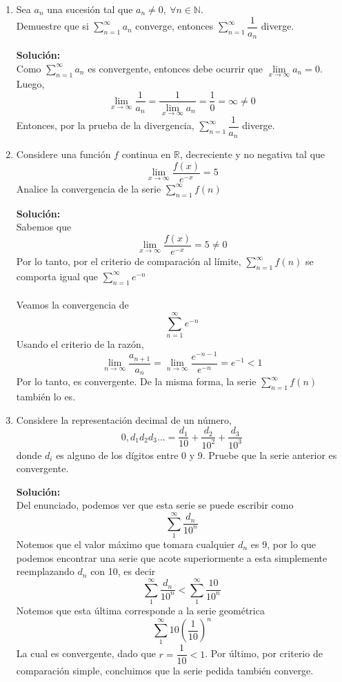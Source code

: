 \documentclass[12pt]{article}
\newenvironment{solucion}
{\begin{mdframed}[backgroundcolor=black!10]
		{\bf Solución:}\\
	}
	{
	\end{mdframed}
}
\newenvironment{preguntas}
{\begin{enumerate}\itemsep12pt
	}
	{
	\end{enumerate}
}
\newcommand{\ra}{\rightarrow}
\newcommand{\N}{\mathbb{N}}
\newcommand{\R}{\mathbb{R}}
\begin{document}
\begin{preguntas}
\begin{solucion}
Luego,
$$\lim\limits_{x \ra \infty} b_n
= \lim\limits_{x \ra \infty} ln(1+a_n)
= ln(1+\lim\limits_{x \ra \infty} a_n)
= ln(1+0)
= 0$$

$$\blacksquare$$
\end{solucion}
\item Sea $a_n$ una sucesión tal que $a_n \neq 0,\ \forall n \in \N$.\\
	Demuestre que si $\sum\limits_{n=1}^{\infty}a_n$ converge, entonces $\sum\limits_{n=1}^{\infty}\dfrac{1}{a_n}$ diverge.
\begin{solucion}
Como $\sum\limits_{n=1}^{\infty}a_n$ es convergente, entonces debe ocurrir que
$\lim\limits_{x \ra \infty} a_n = 0$.\\

Luego,
$$\lim\limits_{x \ra \infty} \dfrac{1}{a_n}
= \dfrac{1}{\lim\limits_{x \ra \infty} a_n}
= \dfrac{1}{0}
= \infty
\neq 0$$
Entonces, por la prueba de la divergencia, $\sum\limits_{n=1}^{\infty}\dfrac{1}{a_n}$ diverge.
\end{solucion}
\item Considere una función $f$ continua en $\R$, decreciente y no negativa tal que
	$$\lim_{x\ra\infty}\dfrac{f(x)}{e^{-x}}=5$$
	Analice la convergencia de la serie $\sum\limits_{n=1}^{\infty}f(n)$
\begin{solucion}
Sabemos que
		$$\lim_{x\ra\infty}\dfrac{f(x)}{e^{-x}}=5 \neq 0$$
		Por lo tanto, por el criterio de comparación al límite, $\sum\limits_{n=1}^{\infty}f(n)$ se comporta igual que $\sum\limits_{n=1}^{\infty}e^{-n}$\\
		\\
		Veamos la convergencia de 
		$$\sum\limits_{n=1}^{\infty}e^{-n}$$
		Usando el criterio de la razón,
		$$\lim\limits_{n \ra \infty} \dfrac{a_{n+1}}{a_n}
		= \lim\limits_{n \ra \infty} \dfrac{e^{-n-1}}{e^{-n}}
		= e^{-1} < 1$$
		Por lo tanto, es convergente. De la misma forma, la serie $\sum\limits_{n=1}^{\infty}f(n)$ también lo es.
\end{solucion}
\item Considere la representación decimal de un número,
$$0,d_1d_2d_3... = \dfrac{d_1}{10} + \dfrac{d_2}{10^2} + \dfrac{d_3}{10^3}$$
donde $d_i$ es alguno de los dígitos entre 0 y 9. Pruebe que la serie anterior es convergente.
\begin{solucion}
Del enunciado, podemos ver que esta serie se puede escribir como
$$\sum\limits_{1}^{\infty} \dfrac{d_n}{10^n}$$
Notemos que el valor máximo que tomara cualquier $d_n$ es 9, por lo que podemos encontrar una serie que acote superiormente a esta simplemente reemplazando $d_n$ con 10, es decir
$$\sum\limits_{1}^{\infty} \dfrac{d_n}{10^n} < \sum\limits_{1}^{\infty} \dfrac{10}{10^n}$$
Notemos que esta última corresponde a la serie geométrica
$$\sum\limits_{1}^{\infty} 10\left(\dfrac{1}{10}\right)^n$$
La cual es convergente, dado que $r = \dfrac{1}{10} < 1$.
Por último, por criterio de comparación simple, concluimos que la serie pedida también converge.
\end{solucion}
\end{preguntas}
\end{document}
